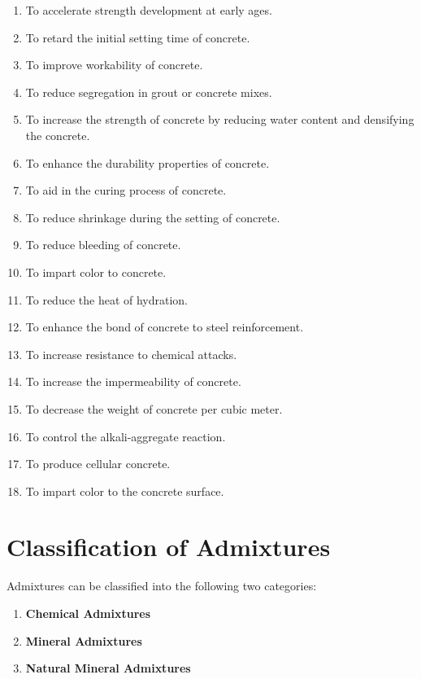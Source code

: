 \documentclass[a4paper,11pt]{book}
\begin{document}
\begin{enumerate}
    \item To accelerate strength development at early ages.
    \item To retard the initial setting time of concrete.
    \item To improve workability of concrete.
    \item To reduce segregation in grout or concrete mixes.
    \item To increase the strength of concrete by reducing water content and densifying the concrete.
    \item To enhance the durability properties of concrete.
    \item To aid in the curing process of concrete.
    \item To reduce shrinkage during the setting of concrete.
    \item To reduce bleeding of concrete.
    \item To impart color to concrete.
    \item To reduce the heat of hydration.
    \item To enhance the bond of concrete to steel reinforcement.
    \item To increase resistance to chemical attacks.
    \item To increase the impermeability of concrete.
    \item To decrease the weight of concrete per cubic meter.
    \item To control the alkali-aggregate reaction.
    \item To produce cellular concrete.
    \item To impart color to the concrete surface.
\end{enumerate}

\section*{Classification of Admixtures}

Admixtures can be classified into the following two categories:

\begin{enumerate}
    \item \textbf{Chemical Admixtures}
    \item \textbf{Mineral Admixtures}
    \item \textbf{Natural Mineral Admixtures}
\end{enumerate}
\end{document}
